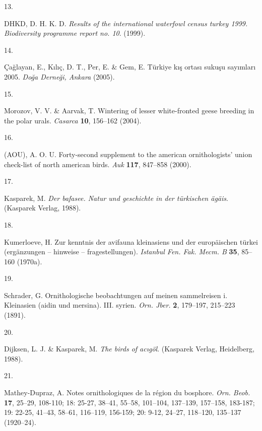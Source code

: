 \documentclass[
  letterpaper,
  DIV=11,
  numbers=noendperiod]{scrreprt}
\newlength{\cslhangindent}
\newlength{\csllabelwidth}
\newlength{\cslentryspacingunit} %
\newenvironment{CSLReferences}[2] %
 {%
  \setlength{\parindent}{0pt}
  \ifodd #1
  \let\oldpar\par
  \def\par{\hangindent=\cslhangindent\oldpar}
  \fi
  \setlength{\parskip}{#2\cslentryspacingunit}
 }%
 {}
\newcommand{\CSLLeftMargin}[1]{\parbox[t]{\csllabelwidth}{#1}}
\newcommand{\CSLRightInline}[1]{\parbox[t]{\linewidth - \csllabelwidth}{#1}\break}
\begin{document}
\begin{CSLReferences}{0}{0}
\leavevmode{}%
\CSLLeftMargin{13. }%
\CSLRightInline{DHKD, D. H. K. D. \emph{Results of the international
waterfowl census turkey 1999. Biodiversity programme report no. 10}.
(1999).}

\leavevmode{}%
\CSLLeftMargin{14. }%
\CSLRightInline{Çağlayan, E., Kılıç, D. T., Per, E. \& Gem, E. Türkiye
kış ortası sukuşu sayımları 2005. \emph{Doğa Derneği, Ankara} (2005).}

\leavevmode{}%
\CSLLeftMargin{15. }%
\CSLRightInline{Morozov, V. V. \& Aarvak, T. Wintering of lesser
white-fronted geese breeding in the polar urals. \emph{Casarca}
\textbf{10}, 156--162 (2004).}

\leavevmode{}%
\CSLLeftMargin{16. }%
\CSLRightInline{(AOU), A. O. U. Forty-second supplement to the american
ornithologists' union check-list of north american birds. \emph{Auk}
\textbf{117}, 847--858 (2000).}

\leavevmode{}%
\CSLLeftMargin{17. }%
\CSLRightInline{Kasparek, M. \emph{Der bafasee. Natur und geschichte in
der türkischen ägäis}. (Kasparek Verlag, 1988).}

\leavevmode{}%
\CSLLeftMargin{18. }%
\CSLRightInline{Kumerloeve, H. Zur kenntnis der avifauna kleinasiens und
der europäischen türkei (ergänzungen -- hinweise -- fragestellungen).
\emph{Istanbul Fen. Fak. Mecm. B} \textbf{35}, 85--160 (1970a).}

\leavevmode{}%
\CSLLeftMargin{19. }%
\CSLRightInline{Schrader, G. Ornithologische beobachtungen auf meinen
sammelreisen i. Kleinasien (aidin und mersina). III. syrien. \emph{Orn.
Jber.} \textbf{2}, 179--197, 215--223 (1891).}

\leavevmode{}%
\CSLLeftMargin{20. }%
\CSLRightInline{Dijksen, L. J. \& Kasparek, M. \emph{The birds of
acıgöl}. (Kasparek Verlag, Heidelberg, 1988).}

\leavevmode{}%
\CSLLeftMargin{21. }%
\CSLRightInline{Mathey-Dupraz, A. Notes ornithologiques de la région du
bosphore. \emph{Orn. Beob.} \textbf{17}, 25--29, 108-110; 18: 25-27,
38--41, 55--58, 101--104, 137--139, 157--158, 183-187; 19: 22-25,
41--43, 58--61, 116--119, 156-159; 20: 9-12, 24--27, 118--120, 135--137
(1920--24).}


\end{CSLReferences}
\end{document}
